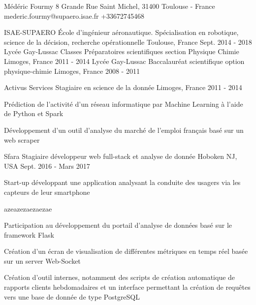 \documentclass[11pt, a4paper, final]{resume}
\begin{document}
	
	\header
		{Médéric}
		{Fourmy}
		{8 Grande Rue Saint Michel, 31400 Toulouse - France}
		{mederic.fourmy@supaero.isae.fr}
		{+33672745468}
	
	
	\begin{cventries}
		\cventry
		{ISAE-SUPAERO}
		{École d'ingénieur aéronautique. Spécialisation en robotique, science de la décision, recherche opérationnelle}
		{Toulouse, France}
		{Sept. 2014 - 2018}
		{}
		\cventry
		{Lycée Gay-Lussac}
		{Classes Préparatoires scientifiques section Physique Chimie}
		{Limoges, France}
		{2011 - 2014}
		{}
		\cventry
		{Lycée Gay-Lussac}
		{Baccalauréat scientifique option physique-chimie}
		{Limoges, France}
		{2008 - 2011}
		{}
	\end{cventries}
	
	\cvsection{Expérience professionnelle}
	\begin{cventries}
		\cventry
		{Activus Services}
		{Stagiaire en science de la donnée}
		{Limoges, France}
		{2011 - 2014}
		{
			\begin{cvitems}{}
				\item Prédiction de l'activité d'un réseau informatique par Machine Learning à l'aide de Python et Spark
				\item Développement d'un outil d'analyse du marché de l'emploi français basé sur un web scraper 
			\end{cvitems}
		}
		\cventry
		{Sfara}
		{Stagiaire développeur web full-stack et analyse de donnée}
		{Hoboken NJ, USA}
		{Sept. 2016 - Mars 2017}
		{
			Start-up développant une application analysant la conduite des usagers via les capteurs de leur smartphone
			\begin{cvitems}{azeazezaezaezae}
				\item Participation au développement du portail d'analyse de données basé sur le framework Flask
				\item Création d'un écran de visualisation de différentes métriques en temps réel basée sur un server Web-Socket
				\item Création d'outil internes, notamment des scripts de création automatique de rapports clients hebdomadaires et un interface permettant la création de requêtes vers une base de donnée de type PostgreSQL
			\end{cvitems}
		}
	\end{cventries}
	
\end{document}
